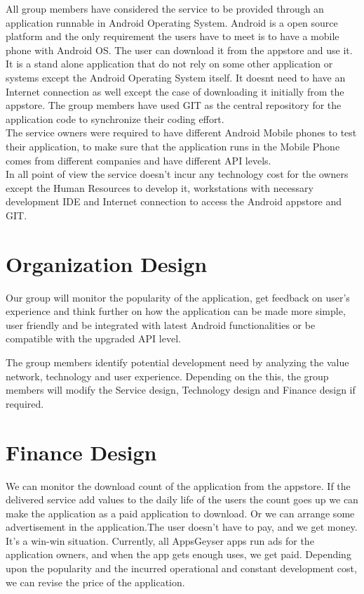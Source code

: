 \documentclass[10pt,a4paper]{report}
\begin{document}
All group members have considered the service to be provided through an application runnable in Android Operating System. Android is a open source platform and the only requirement the users have to meet is to have a mobile phone with Android OS. The user can download it from the appstore and use it. It is a stand alone application that do not rely on some other application or systems except the Android Operating System itself. It doesnt need to have an Internet connection as well except the case of downloading it initially from the appstore. The group members have used GIT as the central repository for the application code to synchronize their coding effort. \\

The service owners were required to have different Android Mobile phones to test their application, to make sure that the application runs in the Mobile Phone comes from different companies and have different API levels. \\

In all point of view the service doesn't incur any technology cost for the owners except the Human Resources to develop it, workstations with necessary development IDE and Internet connection to access the Android appstore and GIT.

\section{Organization Design}

Our group will monitor the popularity of the application, get feedback on user's experience and think further on how the application can be made more simple, user friendly and be integrated with latest Android functionalities or be compatible with the upgraded API level.

The group members identify potential development need by analyzing the value network, technology and user experience. Depending on the this, the group members will modify the Service design, Technology design and Finance design if required.

\section{Finance Design}
We can monitor the download count of the application from the appstore. If the delivered service add values to the daily life of the users the count goes up we can make the application as a paid application to download. Or we can arrange some advertisement in the application.The user doesn’t have to pay, and we get money. It’s a win-win situation. Currently, all AppsGeyser apps run ads for the application owners, and when the app gets enough uses, we get paid. Depending upon the popularity and the incurred operational and constant development cost, we can revise the price of the application.
\end{document}
